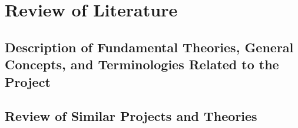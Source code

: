 \chapter{Review of Literature}

\section{Description of Fundamental Theories, General Concepts, and Terminologies Related to the Project}

\section{Review of Similar Projects and Theories}

